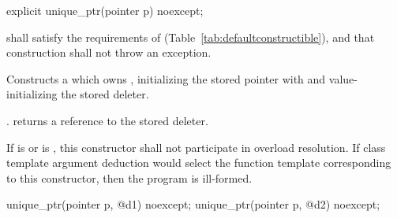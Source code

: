 %
\begin{itemdecl}
explicit unique_ptr(pointer p) noexcept;
\end{itemdecl}

\begin{itemdescr}
\pnum
\requires {} shall
satisfy the requirements of  (Table~\ref{tab:defaultconstructible}),
and that construction shall not throw an exception.

\pnum
\effects Constructs a  which owns
, initializing the stored pointer with  and
value-initializing the stored deleter.

\pnum
\postconditions {}. 
returns a reference to the stored deleter.

\pnum
\remarks If  is  or
 is ,
this constructor shall not participate in overload resolution.
If class template argument deduction
would select the function template corresponding to this constructor,
then the program is ill-formed.
\end{itemdescr}

%
\begin{itemdecl}
unique_ptr(pointer p, @\seebelow@ d1) noexcept;
unique_ptr(pointer p, @\seebelow@ d2) noexcept;
\end{itemdecl}

